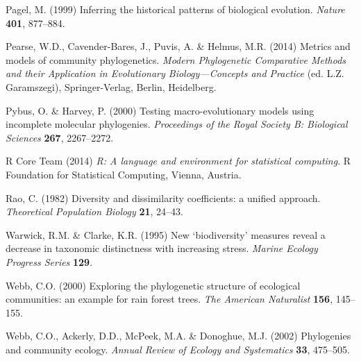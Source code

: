 \documentclass{bioinfo}
\begin{document}
\begin{thebibliography}{30}
Pagel, M. (1999) {Inferring the historical patterns of biological evolution}.
  \emph{Nature} \textbf{401}, 877--884.

Pearse, W.D., Cavender-Bares, J., Puvis, A. \& Helmus, M.R. (2014) Metrics and
  models of community phylogenetics. \emph{Modern Phylogenetic Comparative
  Methods and their Application in Evolutionary Biology---Concepts and
  Practice} (ed. L.Z. Garamszegi), Springer-Verlag, Berlin, Heidelberg.

Pybus, O. \& Harvey, P. (2000) Testing macro-evolutionary models using
  incomplete molecular phylogenies. \emph{Proceedings of the Royal Society B:
  Biological Sciences} \textbf{267}, 2267--2272.

{R Core Team} (2014) \emph{R: A language and environment for statistical
  computing}. R Foundation for Statistical Computing, Vienna, Austria.

Rao, C. (1982) Diversity and dissimilarity coefficients: a unified approach.
  \emph{Theoretical Population Biology} \textbf{21}, 24--43.

Warwick, R.M. \& Clarke, K.R. (1995) New `biodiversity' measures reveal a
  decrease in taxonomic distinctness with increasing stress. \emph{Marine
  Ecology Progress Series} \textbf{129}.

Webb, C.O. (2000) {Exploring the phylogenetic structure of ecological
  communities: an example for rain forest trees}. \emph{The American
  Naturalist} \textbf{156}, 145--155.

Webb, C.O., Ackerly, D.D., McPeek, M.A. \& Donoghue, M.J. (2002) Phylogenies
  and community ecology. \emph{Annual Review of Ecology and Systematics}
  \textbf{33}, 475--505.

\end{thebibliography}
\end{document}
